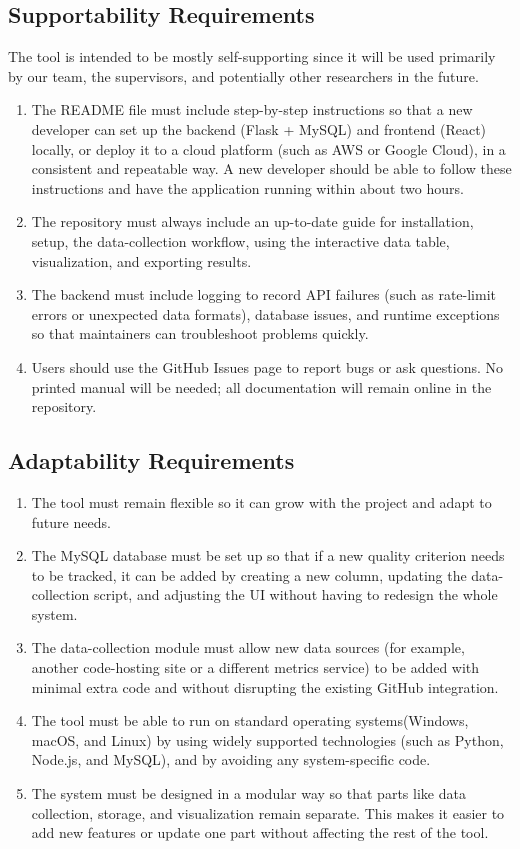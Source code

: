 \documentclass[12pt]{article}
\begin{document}
\subsection{Supportability Requirements}
The tool is intended to be mostly self-supporting since it will be used primarily by our team, the supervisors, and potentially other researchers in the future.
\begin{enumerate}[label=MS-SR\arabic*]
\item The README file must include step-by-step instructions so that a new developer can set up the backend (Flask + MySQL) and frontend (React) locally, or deploy it to a cloud platform (such as AWS or Google Cloud), in a consistent and repeatable way. A new developer should be able to follow these instructions and have the application running within about two hours.
\item The repository must always include an up-to-date guide for installation, setup, the data-collection workflow, using the interactive data table, visualization, and exporting results.
\item The backend must include logging to record API failures (such as rate-limit errors or unexpected data formats), database issues, and runtime exceptions so that maintainers can troubleshoot problems quickly.
\item Users should use the GitHub Issues page to report bugs or ask questions. No printed manual will be needed; all documentation will remain online in the repository.
\end{enumerate}
\subsection{Adaptability Requirements}
\begin{enumerate}[label=MS-AR\arabic*]
\item The tool must remain flexible so it can grow with the project and adapt to future needs.
\item The MySQL database must be set up so that if a new quality criterion needs to be tracked, it can be added by creating a new column, updating the data-collection script, and adjusting the UI without having to redesign the whole system.
\item The data-collection module must allow new data sources (for example, another code-hosting site or a different metrics service) to be added with minimal extra code and without disrupting the existing GitHub integration.
\item The tool must be able to run on standard operating systems(Windows, macOS, and Linux) by using widely supported technologies (such as Python, Node.js, and MySQL), and by avoiding any system-specific code.
\item The system must be designed in a modular way so that parts like data collection, storage, and visualization remain separate. This makes it easier to add new features or update one part without affecting the rest of the tool.
\end{enumerate}
\end{document}
